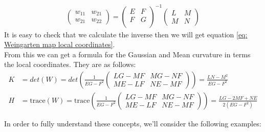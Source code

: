 \documentclass{article}
\theoremstyle{plain}
\theoremstyle{definition}
\theoremstyle{remark}
\begin{document}
\begin{align*}
    \begin{pmatrix}
        w_{11} & w_{21} \\
        w_{21} & w_{22} 
    \end{pmatrix} = 
    \begin{pmatrix}
        E & F \\
        F & G \\
    \end{pmatrix}^{-1}
    \begin{pmatrix}
        L & M \\
        M & N 
    \end{pmatrix}
\end{align*}
It is easy to check that we calculate the inverse then we will get equation \ref{eq: Weingarten map local coordinates}. \\

From this we can get a formula for the Gaussian and Mean curvature in terms the local coordinates. They are as follows:
\begin{align*}
    K & = det(W) = det\left( \frac{1}{EG-F^2} \begin{pmatrix}
        LG - MF & MG - NF \\
        ME - LF & NE- MF
    \end{pmatrix} \right) = \frac{LN-M^2}{EG-F^2} \\
    H & = \text{trace}(W) = \text{trace}\left(\frac{1}{EG-F^2} \begin{pmatrix}
        LG - MF & MG - NF \\
        ME - LF & NE- MF
    \end{pmatrix} \right) = \frac{LG-2MF+NE}{2(EG-F^2)}
\end{align*}

In order to fully understand these concepts, we'll consider the following examples:
\end{document}
